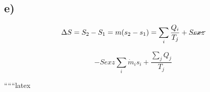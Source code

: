 

\subsection*{e)}

\[
\Delta S = S_2 - S_1 = m (s_2 - s_1) = \sum_i \frac{Q_i}{T_j} + S \cancel{e x z}
\]

\[
- S e x z \sum_i \dot{m}_i s_i + \frac{\sum_j Q_j}{T_j}
\]

``````latex